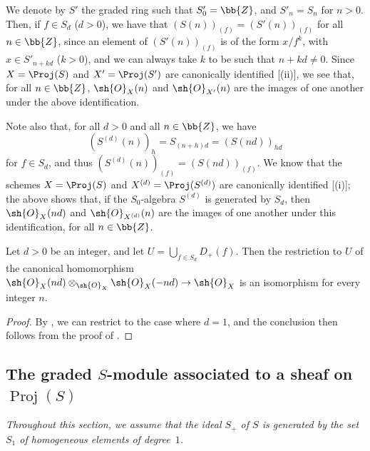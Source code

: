 \begin{env}[2.5.16]
\label{II.2.5.16}
We denote by $S'$ the graded ring such that $S'_0=\bb{Z}$, and $S'_n=S_n$ for $n>0$.
Then, if $f\in S_d$ ($d>0$), we have that $(S(n))_{(f)}=(S'(n))_{(f)}$ for all $n\in\bb{Z}$, since an element of $(S'(n))_{(f)}$ is of the form $x/f^k$, with $x\in S'_{n+kd}$ ($k>0$), and we can always take $k$ to be such that $n+kd\neq0$.
Since $X=\Proj(S)$ and $X'=\Proj(S')$ are canonically identified [(ii)], we see that, for all $n\in\bb{Z}$, $\sh{O}_X(n)$ and $\sh{O}_{X'}(n)$ are the images of one another under the above identification.

Note also that, for all $d>0$ and all $n\in\bb{Z}$, we have
\[
  (S^{(d)}(n))_h = S_{(n+h)d} = (S(nd))_{hd}
\]
for $f\in S_d$, and thus $(S^{(d)}(n))_{(f)}=(S(nd))_{(f)}$.
We know that the schemes $X=\Proj(S)$ and $X^{(d)}=\Proj(S^{(d)})$ are canonically identified [(i)];
the above shows that, if the $S_0$-algebra $S^{(d)}$ is generated by $S_d$, then $\sh{O}_X(nd)$ and $\sh{O}_{X^{(d)}}(n)$ are the images of one another under this identification, for all $n\in\bb{Z}$.
\end{env}

\begin{proposition}[2.5.17]
\label{II.2.5.17}
Let $d>0$ be an integer, and let $U=\bigcup_{f\in S_d}D_+(f)$.
Then the restriction to $U$ of the canonical homomorphism $\sh{O}_X(nd)\otimes_{\sh{O}_X}\sh{O}_X(-nd)\to\sh{O}_X$ is an isomorphism for every integer $n$.
\end{proposition}

\begin{proof}
By , we can restrict to the case where $d=1$, and the conclusion then follows from the proof of .
\end{proof}


\subsection{The graded $S$-module associated to a sheaf on $\operatorname{Proj}(S)$}
\label{subsection:II.2.6}

\emph{Throughout this section, we assume that the ideal $S_+$ of $S$ is generated by the set $S_1$ of homogeneous elements of degree~$1$.}

